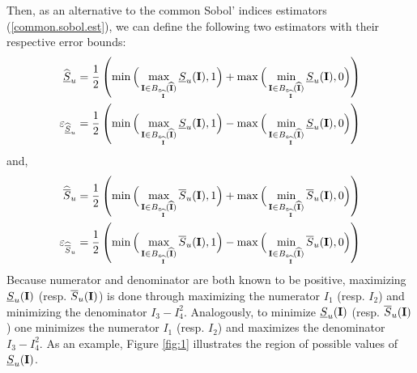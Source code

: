 Then, as an alternative to the common Sobol' indices estimators (\ref{common.sobol.est}), we can define the following two estimators with their respective error bounds:
\begin{gather}
\begin{aligned}
\widehat{\underline{S}}_u & = \frac{1}{2}\left(\min\Big{(}\max_{\boldsymbol{\mathbf{I}}\in B_{\varepsilon_{\widehat{\boldsymbol{\mathbf{I}}}}}(\widehat{\boldsymbol{\mathbf{I}}})} \underline{S}_u(\boldsymbol{\mathbf{I}}),1\Big{)} + \max\Big{(}\min_{\boldsymbol{\mathbf{I}}\in B_{\varepsilon_{\widehat{\boldsymbol{\mathbf{I}}}}}(\widehat{\boldsymbol{\mathbf{I}}})} \underline{S}_u(\boldsymbol{\mathbf{I}}),0\Big{)} \right) \\
\varepsilon_{\widehat{\underline{S}}_u} & = \frac{1}{2}\left(\min\Big{(}\max_{\boldsymbol{\mathbf{I}}\in B_{\varepsilon_{\widehat{\boldsymbol{\mathbf{I}}}}}(\widehat{\boldsymbol{\mathbf{I}}})} \underline{S}_u(\boldsymbol{\mathbf{I}}),1\Big{)} - \max\Big{(}\min_{\boldsymbol{\mathbf{I}}\in B_{\varepsilon_{\widehat{\boldsymbol{\mathbf{I}}}}}(\widehat{\boldsymbol{\mathbf{I}}})} \underline{S}_u(\boldsymbol{\mathbf{I}}),0\Big{)} \right)
\end{aligned}
\label{formula_undersu}
\end{gather}
and,
\begin{gather}
\begin{aligned}
\widehat{\overline{S}}_u & = \frac{1}{2}\left(\min\Big{(}\max_{\boldsymbol{\mathbf{I}}\in B_{\varepsilon_{\widehat{\boldsymbol{\mathbf{I}}}}}(\widehat{\boldsymbol{\mathbf{I}}})} \overline{S}_u(\boldsymbol{\mathbf{I}}),1\Big{)} + \max\Big{(}\min_{\boldsymbol{\mathbf{I}}\in B_{\varepsilon_{\widehat{\boldsymbol{\mathbf{I}}}}}(\widehat{\boldsymbol{\mathbf{I}}})} \overline{S}_u(\boldsymbol{\mathbf{I}}),0\Big{)} \right) \\
\varepsilon_{\widehat{\overline{S}}_u} & = \frac{1}{2}\left(\min\Big{(}\max_{\boldsymbol{\mathbf{I}}\in B_{\varepsilon_{\widehat{\boldsymbol{\mathbf{I}}}}}(\widehat{\boldsymbol{\mathbf{I}}})} \overline{S}_u(\boldsymbol{\mathbf{I}}),1\Big{)} - \max\Big{(}\min_{\boldsymbol{\mathbf{I}}\in B_{\varepsilon_{\widehat{\boldsymbol{\mathbf{I}}}}}(\widehat{\boldsymbol{\mathbf{I}}})} \overline{S}_u(\boldsymbol{\mathbf{I}}),0\Big{)} \right)
\end{aligned}
\label{formula_oversu}
\end{gather}
Because numerator and denominator are both known to be positive, maximizing $\underline{S}_u(\boldsymbol{\mathbf{I}})$ (resp. $\overline{S}_u(\boldsymbol{\mathbf{I}})$) is done through maximizing the numerator $I_1$ (resp. $I_2$) and minimizing the denominator $I_3-I_4^2$. Analogously, to minimize $\underline{S}_u(\boldsymbol{\mathbf{I}})$ (resp. $\overline{S}_u(\boldsymbol{\mathbf{I}})$) one minimizes the numerator $I_1$ (resp. $I_2$) and maximizes the denominator $I_3-I_4^2$. As an example, Figure \ref{fig:1} illustrates the region of possible values of $\underline{S}_u(\boldsymbol{\mathbf{I}})$.
